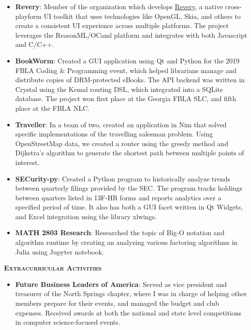 \documentclass{article}
\newcommand{\sectionHeader}[1]{{\large \textbf{\textsc{#1}}}\hspace{5pt}\xrfill[.5ex]{.4pt}}
\begin{document}
  \begin{itemize}
    \item \textbf{Revery}: Member of the organization which develops \href{https://github.com/revery-ui/revery}{Revery}, a native cross-playform UI toolkit that uses technologies like OpenGL, Skia, and others to create a consistent UI experience across multiple platforms. The project leverages the ReasonML/OCaml platform and integrates with both Javascript and C/C++.
    \item \textbf{BookWorm}: Created a GUI application using Qt and Python for the 2019 FBLA Coding \& Programming event, which helped librarians manage and distribute copies of DRM-protected eBooks. The API backend was written in Crystal using the Kemal routing DSL, which integrated into a SQLite database. The project won first place at the Georgia FBLA SLC, and fifth place at the FBLA NLC.
    \item \textbf{Traveller}: In a team of two, created an application in Nim that solved specific implementations of the travelling salesman problem. Using OpenStreetMap data, we created a router using the greedy method and Dijkstra's algorithm to generate the shortest path between multiple points of interest.
    \item \textbf{SECurity-py}: Created a Python program to historically analyze trends between quarterly filings provided by the SEC. The program tracks holdings between quarters listed in 13F-HR forms and reports analytics over a specified period of time. It also has both a GUI facet written in Qt Widgets, and Excel integration using the library xlwings.
    \item \textbf{MATH 2803 Research}: Researched the topic of Big-O notation and algorithm runtime by creating an analyzing various factoring algorithms in Julia using Jupyter notebook.
  \end{itemize}

  \vspace{8pt}

  \sectionHeader{Extracurricular Activities}

  \vspace{3pt}

  \begin{itemize}
    \item \textbf{Future Business Leaders of America}: Served as vice president and treasurer of the North Springs chapter, where I was in charge of helping other members prepare for their events, and managed the budget and club expenses. Received awards at both the national and state level competitions in computer science-focused events.
  \end{itemize}
\end{document}
